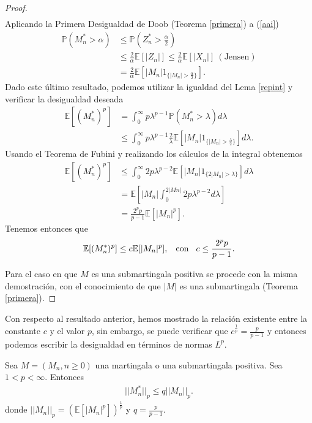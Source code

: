 \begin{proof}
\begin{align}
	\end{align}
	Aplicando la Primera Desigualdad de Doob (Teorema \ref{primera}) a (\ref{aai}) 
	\begin{align*}
		\mathbb{P}(M_n^{*} > \alpha) & \leq \mathbb{P}(Z_n^{*} > \frac{\alpha}{2}) \\
		& \leq \frac{2}{\alpha} \mathbb{E}[|Z_n|] \leq \frac{2}{\alpha} \mathbb{E}[|X_n|] \ (\text{Jensen}) \\
		& = \frac{2}{\alpha} \mathbb{E}[|M_n|1_{\{|M_n| > \frac{\alpha}{2}\}}].
	\end{align*}
	Dado este último resultado, podemos utilizar la igualdad del Lema \ref{repint} y verificar la desigualdad deseada
	\begin{align*}
		\mathbb{E}[(M_n^{*})^p] & = \int_0^{\infty} p \lambda^{p-1} \mathbb{P}(M_n^{*} > \lambda) d\lambda \\
		& \leq \int_0^{\infty} p \lambda^{p-1}  \frac{2}{\lambda} \mathbb{E}[|M_n|1_{\{|M_n| > \frac{\lambda}{2}\}}] d\lambda.
	\end{align*}
	Usando el Teorema de Fubini y realizando los cálculos de la integral obtenemos
	\begin{align*}
		\mathbb{E}[(M_n^{*})^p] & \leq \int_0^{\infty} 2p \lambda^{p-2} \mathbb{E}[|M_n|1_{\{2|M_n| > \lambda\}} ] d\lambda \\
		& = \mathbb{E}\left[ |M_n| \int_0^{2|Mn|} 2p\lambda^{p-2} d\lambda \right] \\
		& = \frac{2^p p}{p-1} \mathbb{E}[|M_n|^p].
	\end{align*}
	Tenemos entonces que
	\begin{align*}
	\mathbb{E}[(M_n^{*})^p] \leq c\mathbb{E}[|M_n|^p], \hspace{0.3cm} \text{con} \hspace{0.3cm} c \leq \frac{2^p p}{p-1}.
	\end{align*} 
	
Para el caso en que $M$ es una submartingala positiva se procede con la misma demostración, con el conocimiento de que $|M|$ es una submartingala (Teorema \ref{primera}).
\end{proof}

Con respecto al resultado anterior, hemos mostrado la relación existente entre la constante $c$ y el valor $p$, sin embargo, se puede verificar que $c^{\frac{1}{p}} = \frac{p}{p-1}$ y entonces podemos escribir la desigualdad en términos de normas $L^p$.

\begin{theorem}
\label{lp2}
	Sea $M = (M_n, n \geq 0)$ una martingala o una submartingala positiva. Sea $1 < p < \infty$. Entonces
	\begin{align*}
		||M_n^{*}||_p \leq q ||M_n||_p.
	\end{align*}
donde $||M_n||_p = (\mathbb{E}[|M_n|^p])^{\frac{1}{p}}$ y $q = \frac{p}{p-1} $.
\end{theorem}


